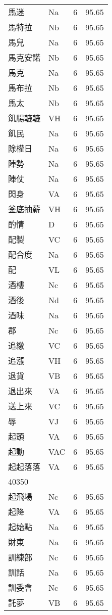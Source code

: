 \documentclass[twocolumn]{book}
\begin{document}
\begin{supertabular}{llrr}
馬迷 & Na & 6 &  95.65\\
馬特拉 & Nb & 6 &  95.65\\
馬兒 & Na & 6 &  95.65\\
馬克安諾 & Nb & 6 &  95.65\\
馬克 & Na & 6 &  95.65\\
馬布拉 & Nb & 6 &  95.65\\
馬太 & Nb & 6 &  95.65\\
飢腸轆轆 & VH & 6 &  95.65\\
飢民 & Na & 6 &  95.65\\
除權日 & Na & 6 &  95.65\\
陣勢 & Na & 6 &  95.65\\
陣仗 & Na & 6 &  95.65\\
閃身 & VA & 6 &  95.65\\
釜底抽薪 & VH & 6 &  95.65\\
酌情 & D & 6 &  95.65\\
配製 & VC & 6 &  95.65\\
配合度 & Na & 6 &  95.65\\
配 & VL & 6 &  95.65\\
酒樓 & Nc & 6 &  95.65\\
酒後 & Nd & 6 &  95.65\\
酒味 & Na & 6 &  95.65\\
郡 & Nc & 6 &  95.65\\
追繳 & VC & 6 &  95.65\\
追漲 & VH & 6 &  95.65\\
退貨 & VB & 6 &  95.65\\
退出來 & VA & 6 &  95.65\\
送上來 & VC & 6 &  95.65\\
辱 & VJ & 6 &  95.65\\
起頭 & VA & 6 &  95.65\\
起動 & VAC & 6 &  95.65\\
起起落落 & VA & 6 &  95.65\\
40350\\
起飛場 & Nc & 6 &  95.65\\
起降 & VA & 6 &  95.65\\
起始點 & Na & 6 &  95.65\\
財東 & Na & 6 &  95.65\\
訓練部 & Nc & 6 &  95.65\\
訓話 & Na & 6 &  95.65\\
訓委會 & Nc & 6 &  95.65\\
託夢 & VB & 6 &  95.65\\

\end{supertabular}
\end{document}
